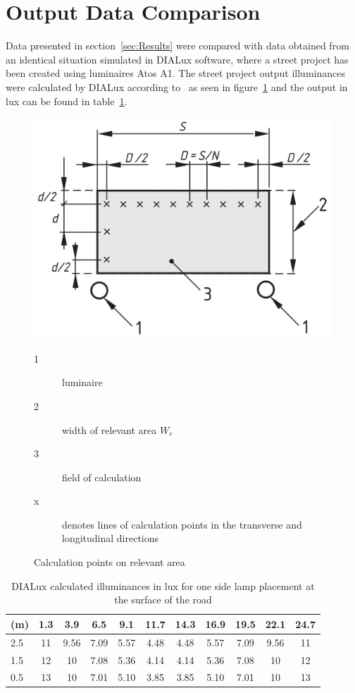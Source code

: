 \section{Output Data Comparison}
Data presented in section~\ref{sec:Results} were compared with data obtained from an identical situation simulated in DIALux software, where a street project has been created using luminaires Atos A1. The street project output illuminances were calculated by DIALux according to~\cite{CSN_EN_13201-3} as seen in figure~\ref{fig:lumIntDistr} and the output in lux can be found in table~\ref{tab:DialuxOneSideLamps}.

\begin{figure}[htb]
  \centering
  \includegraphics[width=0.8\columnwidth]{13201-3_points}
  \caption{Calculation points on relevant area \cite{CSN_EN_13201-3}}
  \label{fig:lumIntDistr}
	\begin{description}
		\item[1] luminaire
		\item[2] width of relevant area $W_{r}$
		\item[3] field of calculation
		\item[x] denotes lines of calculation points in the transverse and longitudinal directions
	\end{description}
\end{figure}

\begin{table}[htb]
	\renewcommand{\arraystretch}{1.3}
	\caption{DIALux calculated illuminances in lux for one side lamp placement at the surface of the road}
 	\label{tab:DialuxOneSideLamps}
	\centering
  \begin{tabular}{ l || c | c | c | c | c | c | c | c | c | c }
    \hline
    \textbf{(m)} & 1.3 & 3.9 & 6.5 & 9.1 & 11.7 & 14.3 & 16.9 & 19.5 & 22.1 & 24.7\\ \hline \hline
    2.5 & 11 & 9.56 & 7.09 & 5.57 & 4.48 & 4.48 & 5.57 & 7.09 & 9.56 & 11\\ \hline
		1.5 & 12 & 10 & 7.08 & 5.36 & 4.14 & 4.14 & 5.36 & 7.08 & 10 & 12\\ \hline
		0.5 & 13 & 10 & 7.01 & 5.10 & 3.85 & 3.85 & 5.10 & 7.01 & 10 & 13\\ \hline
  \end{tabular}
\end{table}